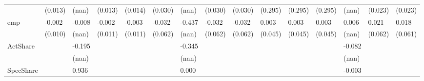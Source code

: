 \begin{table}
\begin{center}
\begin{tabular}{lllllllllllllll}
                  & (0.013)            & (nan)              & (0.013)                & (0.014)             & (0.030)              & (nan)                & (0.030)                  & (0.030)               & (0.295)              & (0.295)                  & (0.295)               & (nan)                         & (0.023)                                   & (0.023)                                 \\
emp               & -0.002             & -0.008             & -0.002                 & -0.003              & -0.032               & -0.437               & -0.032                   & -0.032                & 0.003                & 0.003                    & 0.003                 & 0.006                         & 0.021                                     & 0.018                                   \\
                  & (0.010)            & (nan)              & (0.011)                & (0.011)             & (0.062)              & (nan)                & (0.062)                  & (0.062)               & (0.045)              & (0.045)                  & (0.045)               & (nan)                         & (0.062)                                   & (0.061)                                 \\
ActShare          &                    & -0.195             &                        &                     &                      & -0.345               &                          &                       &                      &                          &                       & -0.082                        &                                           &                                         \\
                  &                    & (nan)              &                        &                     &                      & (nan)                &                          &                       &                      &                          &                       & (nan)                         &                                           &                                         \\
SpecShare         &                    & 0.936              &                        &                     &                      & 0.000                &                          &                       &                      &                          &                       & -0.003                        &                                           &                                         \\

\end{tabular}
\end{center}
\end{table}

